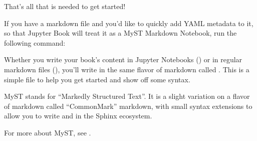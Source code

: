 \documentclass[letterpaper,10pt,english]{jupyterBook}
\begin{document}
\sphinxAtStartPar
That’s all that is needed to get started!

\begin{DUlineblock}{0em}
\item[] 
\end{DUlineblock}

\sphinxAtStartPar
If you have a markdown file and you’d like to quickly add YAML metadata to it, so that Jupyter Book will treat it as a MyST Markdown Notebook, run the following command:

\begin{sphinxVerbatim}[commandchars=\\\{\}]
   
\end{sphinxVerbatim}

\begin{DUlineblock}{0em}
\item[] 
\end{DUlineblock}

\sphinxAtStartPar
Whether you write your book’s content in Jupyter Notebooks () or
in regular markdown files (), you’ll write in the same flavor of markdown
called .
This is a simple file to help you get started and show off some syntax.

\begin{DUlineblock}{0em}
\item[] 
\end{DUlineblock}

\sphinxAtStartPar
MyST stands for “Markedly Structured Text”. It
is a slight variation on a flavor of markdown called “CommonMark” markdown,
with small syntax extensions to allow you to write  and 
in the Sphinx ecosystem.

\sphinxAtStartPar
For more about MyST, see .

\begin{DUlineblock}{0em}
\item[] 
\end{DUlineblock}
\end{document}
